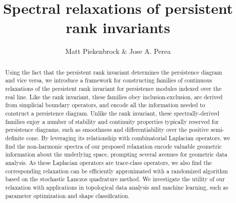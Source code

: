 \documentclass[10pt]{article}
\title{\vspace{-2.0em} 
Spectral relaxations of persistent rank invariants
\vspace{-0.5em}}
\author{Matt Piekenbrock \& Jose A. Perea}
\date{}
\numberwithin{equation}{section}
\newcommand{\+}{%
	\raisebox{0.18ex}{\scaleobj{0.55}{+}}
}
\theoremstyle{definition}
\theoremstyle{definition}
\begin{document}
\maketitle

\begin{abstract}
Using the fact that the persistent rank invariant determines the persistence diagram and vice versa, we introduce a framework for constructing families of continuous relaxations of the persistent rank invariant for persistence modules indexed over the real line. 
Like the rank invariant, these families obey inclusion-exclusion, are derived from simplicial boundary operators, and encode all the information needed to construct a persistence diagram. 
Unlike the rank invariant, these spectrally-derived families enjoy a number of stability and continuity properties typically reserved for persistence diagrams, such as smoothness and differentiability over the positive semi-definite cone. 
By leveraging its relationship with combinatorial Laplacian operators, we find the non-harmonic spectra of our proposed relaxation encode valuable geometric information about the underlying space, prompting several avenues for geometric data analysis.
As these Laplacian operators are trace-class operators, we also find the corresponding relaxation can be efficiently approximated with a randomized algorithm based on the stochastic Lanczos quadrature method.
We investigate the utility of our relaxation with applications in topological data analysis and machine learning, such as parameter optimization and shape classification.

\end{abstract}
\end{document}
